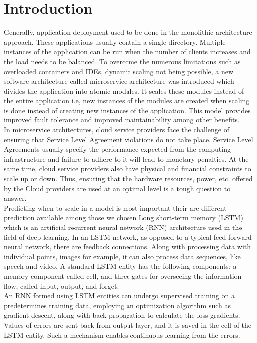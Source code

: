 \documentclass[conference]{IEEEtran}
\begin{document}
\section{Introduction}
Generally, application deployment used to be done in the monolithic architecture approach. These applications usually contain a single directory. Multiple instances of the application can be run when the number of clients increases and the load needs to be balanced. To overcome the numerous limitations such as overloaded containers and IDEs, dynamic scaling not being possible, a new software architecture called microservice architecture was introduced which divides the application into atomic modules. It scales these modules instead of the entire application i.e, new instances of the modules are created when scaling is done instead of creating new instances of the application. This model provides improved fault tolerance and improved maintainability among other benefits. \\

In microservice architectures, cloud service providers face the challenge of ensuring that Service Level Agreement violations do not take place. Service Level Agreements usually specify the performance expected from the computing infrastructure and failure to adhere to it will lead to monetary penalties. At the same time, cloud service providers also have physical and financial constraints to scale up or down. Thus, ensuring that the hardware resources, power, etc. offered by the Cloud providers are used at an optimal level is a tough question to answer. \\


Predicting when to scale in a model is most important their are different prediction available among those we chosen Long short-term memory (LSTM) which is an artificial recurrent neural network (RNN) architecture used in the field of deep learning. In an LSTM network, as opposed to a typical feed forward neural network, there are feedback connections. Along with processing data with individual points, images for example, it can also process data sequences, like speech and video. A standard LSTM entity has the following components: a memory component called cell, and three gates for overseeing the information flow, called input, output, and forget. \\

An RNN formed using LSTM entities can undergo supervised training on a predetermines training data, employing an optimization algorithm such as gradient descent, along with back propagation to calculate the loss gradients. Values of errors are sent back from  output layer, and it is saved in the cell of the LSTM entity. Such a mechanism enables continuous learning from the errors.\\
\end{document}

